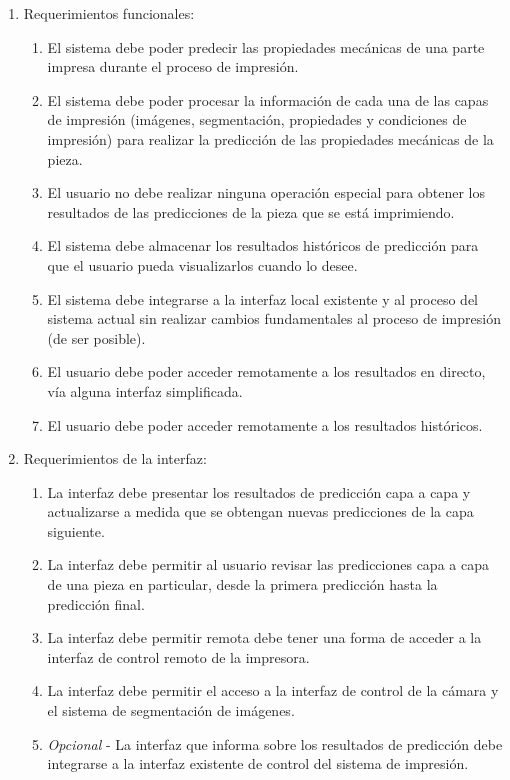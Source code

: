 \documentclass[
11pt, %
]{charter}
\begin{document}
\begin{enumerate}
	\item Requerimientos funcionales:
		\begin{enumerate}
			\item El sistema debe poder predecir las propiedades mecánicas de una parte impresa durante el proceso de impresión.
			\item El sistema debe poder procesar la información de cada una de las capas de impresión (imágenes, segmentación, propiedades y condiciones de impresión) para realizar la predicción de las propiedades mecánicas de la pieza.
			\item El usuario no debe realizar ninguna operación especial para obtener los resultados de las predicciones de la pieza que se está imprimiendo.
            \item El sistema debe almacenar los resultados históricos de predicción para que el usuario pueda visualizarlos cuando lo desee.
            \item El sistema debe integrarse a la interfaz local existente y al proceso del sistema actual sin realizar cambios fundamentales al proceso de impresión (de ser posible).
            \item El usuario debe poder acceder remotamente a los resultados en directo, vía alguna interfaz simplificada.
            \item El usuario debe poder acceder remotamente a los resultados históricos.
		\end{enumerate}
    \item Requerimientos de la interfaz:
        \begin{enumerate}
            \item La interfaz debe presentar los resultados de predicción capa a capa y actualizarse a medida que se obtengan nuevas predicciones de la capa siguiente.
            \item La interfaz debe permitir al usuario revisar las predicciones capa a capa de una pieza en particular, desde la primera predicción hasta la predicción final.
            \item La interfaz debe permitir remota debe tener una forma de acceder a la interfaz de control remoto de la impresora.
            \item La interfaz debe permitir el acceso a la interfaz de control de la cámara y el sistema de segmentación de imágenes.
            \item \textit{Opcional} - La interfaz que informa sobre los resultados de predicción debe integrarse a la interfaz existente de control del sistema de impresión.

\end{enumerate}
\end{enumerate}
\end{document}
